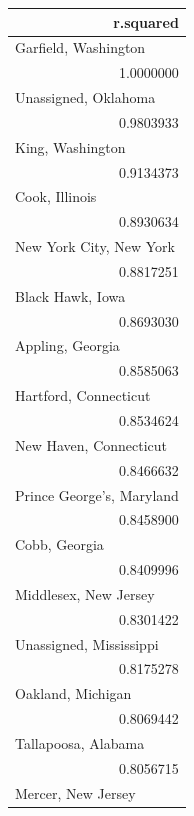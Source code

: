 \documentclass[
]{article}
\begin{document}
\captionsetup[table]{labelformat=empty,skip=1pt}
\begin{longtable}{r}
\toprule
r.squared \\ 
\midrule
\multicolumn{1}{l}{Garfield, Washington} \\ 
\midrule
1.0000000 \\ 
\midrule
\multicolumn{1}{l}{Unassigned, Oklahoma} \\ 
\midrule
0.9803933 \\ 
\midrule
\multicolumn{1}{l}{King, Washington} \\ 
\midrule
0.9134373 \\ 
\midrule
\multicolumn{1}{l}{Cook, Illinois} \\ 
\midrule
0.8930634 \\ 
\midrule
\multicolumn{1}{l}{New York City, New York} \\ 
\midrule
0.8817251 \\ 
\midrule
\multicolumn{1}{l}{Black Hawk, Iowa} \\ 
\midrule
0.8693030 \\ 
\midrule
\multicolumn{1}{l}{Appling, Georgia} \\ 
\midrule
0.8585063 \\ 
\midrule
\multicolumn{1}{l}{Hartford, Connecticut} \\ 
\midrule
0.8534624 \\ 
\midrule
\multicolumn{1}{l}{New Haven, Connecticut} \\ 
\midrule
0.8466632 \\ 
\midrule
\multicolumn{1}{l}{Prince George's, Maryland} \\ 
\midrule
0.8458900 \\ 
\midrule
\multicolumn{1}{l}{Cobb, Georgia} \\ 
\midrule
0.8409996 \\ 
\midrule
\multicolumn{1}{l}{Middlesex, New Jersey} \\ 
\midrule
0.8301422 \\ 
\midrule
\multicolumn{1}{l}{Unassigned, Mississippi} \\ 
\midrule
0.8175278 \\ 
\midrule
\multicolumn{1}{l}{Oakland, Michigan} \\ 
\midrule
0.8069442 \\ 
\midrule
\multicolumn{1}{l}{Tallapoosa, Alabama} \\ 
\midrule
0.8056715 \\ 
\midrule
\multicolumn{1}{l}{Mercer, New Jersey} \\ 

\end{longtable}
\end{document}
